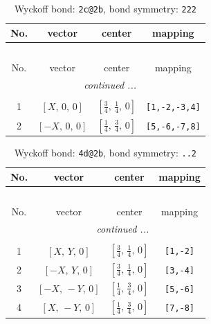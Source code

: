 \documentclass[fleqn,8pt]{jsarticle}
\begin{document}
\begin{longtable}{cccc}
\caption{Wyckoff bond: {\tt 2c@2b}, bond symmetry: {\tt 222}}
 \\
 \hline \hline
No. & vector & center & mapping \\ \hline \endfirsthead

\multicolumn{3}{l}{\tablename\ \thetable{}} \\
 \hline \hline
No. & vector & center & mapping \\ \hline \endhead

 \hline \hline
\multicolumn{3}{r}{\footnotesize\it continued ...} \\ \endfoot

 \hline \hline
\multicolumn{3}{r}{} \\ \endlastfoot

1 & $\left[ X,\, 0,\, 0 \right]$ & $\left[ \frac{3}{4},\, \frac{1}{4},\, 0 \right]$ & {\tt [1,-2,-3,4]} \\ \hline
2 & $\left[ - X,\, 0,\, 0 \right]$ & $\left[ \frac{1}{4},\, \frac{3}{4},\, 0 \right]$ & {\tt [5,-6,-7,8]} \\
\end{longtable}
\renewcommand{\arraystretch}{1.2}
\begin{longtable}{cccc}
\caption{Wyckoff bond: {\tt 4d@2b}, bond symmetry: {\tt ..2}}
 \\
 \hline \hline
No. & vector & center & mapping \\ \hline \endfirsthead

\multicolumn{3}{l}{\tablename\ \thetable{}} \\
 \hline \hline
No. & vector & center & mapping \\ \hline \endhead

 \hline \hline
\multicolumn{3}{r}{\footnotesize\it continued ...} \\ \endfoot

 \hline \hline
\multicolumn{3}{r}{} \\ \endlastfoot

1 & $\left[ X,\, Y,\, 0 \right]$ & $\left[ \frac{3}{4},\, \frac{1}{4},\, 0 \right]$ & {\tt [1,-2]} \\ \hline
2 & $\left[ - X,\, Y,\, 0 \right]$ & $\left[ \frac{3}{4},\, \frac{1}{4},\, 0 \right]$ & {\tt [3,-4]} \\ \hline
3 & $\left[ - X,\, - Y,\, 0 \right]$ & $\left[ \frac{1}{4},\, \frac{3}{4},\, 0 \right]$ & {\tt [5,-6]} \\ \hline
4 & $\left[ X,\, - Y,\, 0 \right]$ & $\left[ \frac{1}{4},\, \frac{3}{4},\, 0 \right]$ & {\tt [7,-8]} \\
\end{longtable}
\end{document}
